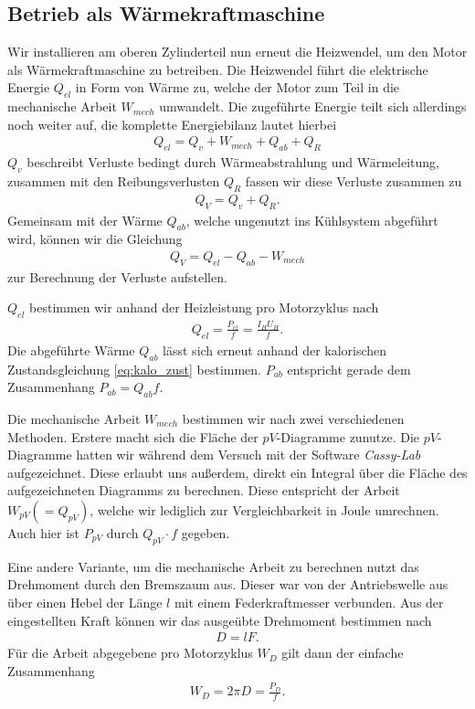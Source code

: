 \subsection{Betrieb als Wärmekraftmaschine}

Wir installieren am oberen Zylinderteil nun erneut die Heizwendel, um den Motor als Wärmekraftmaschine zu betreiben. Die Heizwendel führt die elektrische Energie $Q_{el}$ in Form von Wärme zu, welche der Motor zum Teil in die mechanische Arbeit $W_{mech}$ umwandelt. Die zugeführte Energie teilt sich allerdings noch weiter auf, die komplette Energiebilanz lautet hierbei
\begin{align}
    Q_{el} = Q_v + W_{mech} + Q_{ab} + Q_R
\end{align}
$Q_v$ beschreibt Verluste bedingt durch Wärmeabstrahlung und Wärmeleitung, zusammen mit den Reibungsverlusten $Q_R$ fassen wir diese Verluste zusammen zu
\begin{align}
    Q_{V} = Q_v + Q_R.
\end{align}
Gemeinsam mit der Wärme $Q_{ab}$, welche ungenutzt ins Kühlsystem abgeführt wird, können wir die Gleichung
\begin{align}
    Q_{V} = Q_{el} - Q_{ab} - W_{mech} \label{eq:Q_V}
\end{align}
zur Berechnung der Verluste aufstellen.

$Q_{el}$ bestimmen wir anhand der Heizleistung pro Motorzyklus nach
\begin{align}
    Q_{el} = \frac{P_{el}}{f} = \frac{I_H U_H}{f}.
\end{align}
Die abgeführte Wärme $Q_{ab}$ lässt sich erneut anhand der kalorischen Zustandsgleichung \eqref{eq:kalo_zust} bestimmen. $P_{ab}$ entspricht gerade dem Zusammenhang $P_{ab} = Q_{ab} f$.

Die mechanische Arbeit $W_{mech}$ bestimmen wir nach zwei verschiedenen Methoden. Erstere macht sich die Fläche der $pV$-Diagramme zunutze. Die $pV$-Diagramme hatten wir während dem Versuch mit der Software \textit{Cassy-Lab} aufgezeichnet. Diese erlaubt uns außerdem, direkt ein Integral über die Fläche des aufgezeichneten Diagramms zu berechnen. Diese entspricht der Arbeit $W_{pV} (= Q_{pV})$, welche wir lediglich zur Vergleichbarkeit in Joule umrechnen. Auch hier ist $P_{pV}$ durch $Q_{pV}\cdot f$ gegeben.

Eine andere Variante, um die mechanische Arbeit zu berechnen nutzt das Drehmoment durch den Bremszaum aus. Dieser war von der Antriebswelle aus über einen Hebel der Länge $l$ mit einem Federkraftmesser verbunden. Aus der eingestellten Kraft können wir das ausgeübte Drehmoment bestimmen nach
\begin{align}
    D = l F.
\end{align}
Für die Arbeit abgegebene pro Motorzyklus $W_D$ gilt dann der einfache Zusammenhang
\begin{align}
    W_D = 2 \pi D = \frac{P_D}{f}.
\end{align}

